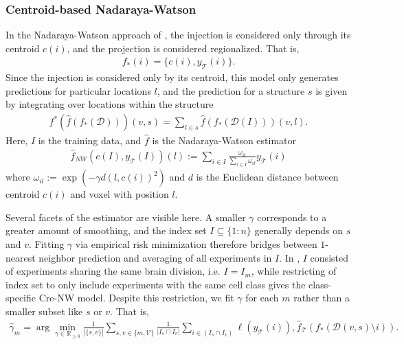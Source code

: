 \subsubsection{Centroid-based Nadaraya-Watson}

In the Nadaraya-Watson approach of \citet{Knox2019-ot}, the injection is considered only through its centroid $c(i)$, and the projection is considered regionalized.
That is,
\begin{eqnarray*}
f_*(i) = \{c(i), y_{\mathcal T}(i)\}.
\end{eqnarray*}
Since the injection is considered only by its centroid, this model only generates predictions for particular locations $l$, and the prediction for a structure $s$ is given by integrating over locations within the structure
\begin{eqnarray*}
\label{eq:regionalize}
f^* (\hat f (f_*(\mathcal D))) (v,s) = \sum_{l \in s} \hat f (f_*(\mathcal D(I))) (v,l ).
\end{eqnarray*}
Here, $I$ is the training data, and $\hat f$ is the Nadaraya-Watson estimator
\begin{eqnarray*}
\hat f_{NW}( c(I) , y_{\mathcal T}(I) ) (l) :=  \sum_{i \in I} \frac{ \omega_{i l}}{\sum_{i \in I} \omega_{i l}} y_{\mathcal T}(i)
\end{eqnarray*}
where $\omega_{i l } := \exp( - \gamma d( l , c(i))^2 )$ and $d$ is the Euclidean distance between centroid $c(i)$ and voxel with position $l$.

Several facets of the estimator are visible here. %
A smaller $\gamma$ corresponds to a greater amount of smoothing, and the index set $I \subseteq  \{1:n\}$ generally depends on $s$ and $v$.
Fitting $\gamma$ via empirical risk minimization therefore bridges between $1$-nearest neighbor prediction and averaging of all experiments in $I$.
In \citet{Knox2019-ot}, $I$ consisted of experiments sharing the same brain division, i.e. $I = I_m$, while restricting of index set to only include experiments with the same cell class gives the class-specific Cre-NW model.
Despite this restriction, we fit $\gamma$ for each $m$ rather than a smaller subset like $s$ or $v$.
That is,
\begin{eqnarray}
\label{eq:gamma_sel}
\widehat \gamma_m =  \arg \min_{\gamma \in \mathbb R_{\geq 0}} \frac{1}{|\{s,v\}|} \sum_{s,v \in \{m,\mathcal V\}} \frac{1}{ |I_{s} \cap I_v |} \sum_{i \in (I_{s} \cap I_v ) } \ell (y_{\mathcal T}(i)), \hat f_{\mathcal T} (f_*(\mathcal D(v,s) \setminus i)) .
\end{eqnarray}

